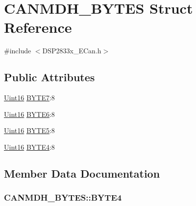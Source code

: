 \hypertarget{struct_c_a_n_m_d_h___b_y_t_e_s}{}\section{C\+A\+N\+M\+D\+H\+\_\+\+B\+Y\+T\+E\+S Struct Reference}
\label{struct_c_a_n_m_d_h___b_y_t_e_s}


{\ttfamily \#include $<$D\+S\+P2833x\+\_\+\+E\+Can.\+h$>$}

\subsection*{Public Attributes}
\begin{DoxyCompactItemize}
\item 
\hyperlink{_d_s_p2833x___device_8h_a59a9f6be4562c327cbfb4f7e8e18f08b}{Uint16} \hyperlink{struct_c_a_n_m_d_h___b_y_t_e_s_aa146cf66bb0618cf30344954a52f3228}{B\+Y\+T\+E7}\+:8
\item 
\hyperlink{_d_s_p2833x___device_8h_a59a9f6be4562c327cbfb4f7e8e18f08b}{Uint16} \hyperlink{struct_c_a_n_m_d_h___b_y_t_e_s_ad49a573b3d90a866f89afc9253b45810}{B\+Y\+T\+E6}\+:8
\item 
\hyperlink{_d_s_p2833x___device_8h_a59a9f6be4562c327cbfb4f7e8e18f08b}{Uint16} \hyperlink{struct_c_a_n_m_d_h___b_y_t_e_s_ab11eea4b3515c79999d4e8ebce5bc482}{B\+Y\+T\+E5}\+:8
\item 
\hyperlink{_d_s_p2833x___device_8h_a59a9f6be4562c327cbfb4f7e8e18f08b}{Uint16} \hyperlink{struct_c_a_n_m_d_h___b_y_t_e_s_a71d8a2aa5dff62ef61801f78f1dc7089}{B\+Y\+T\+E4}\+:8
\end{DoxyCompactItemize}


\subsection{Member Data Documentation}
\hypertarget{struct_c_a_n_m_d_h___b_y_t_e_s_a71d8a2aa5dff62ef61801f78f1dc7089}{}
\subsubsection[{B\+Y\+T\+E4}]{ C\+A\+N\+M\+D\+H\+\_\+\+B\+Y\+T\+E\+S\+::\+B\+Y\+T\+E4}\label{struct_c_a_n_m_d_h___b_y_t_e_s_a71d8a2aa5dff62ef61801f78f1dc7089}
\hypertarget{struct_c_a_n_m_d_h___b_y_t_e_s_ab11eea4b3515c79999d4e8ebce5bc482}{}
